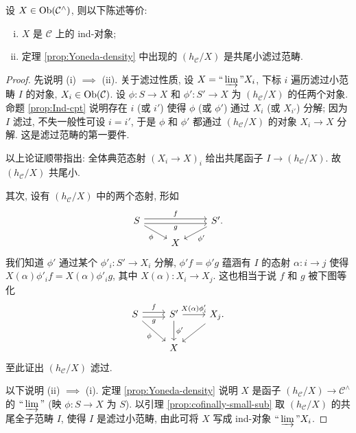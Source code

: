 \begin{proposition}[辨认 ind-对象]\label{prop:recognize-ind}
	设 $X \in \operatorname{Ob}(\mathcal{C}^\wedge)$, 则以下陈述等价:
	\begin{enumerate}[(i)]
		\item $X$ 是 $\mathcal{C}$ 上的 ind-对象;
		\item 定理 \ref{prop:Yoneda-density} 中出现的 $(h_{\mathcal{C}}/X)$ 是共尾小滤过范畴.
	\end{enumerate}
\end{proposition}
\begin{proof}
	先说明 (i) $\implies$ (ii). 关于滤过性质, 设 $X = \Yinjlim X_i$, 下标 $i$ 遍历滤过小范畴 $I$ 的对象, $X_i \in \operatorname{Ob}(\mathcal{C})$. 设 $\phi: S \to X$ 和 $\phi': S' \to X$ 为 $(h_{\mathcal{C}}/X)$ 的任两个对象. 命题 \ref{prop:Ind-cpt} 说明存在 $i$ (或 $i'$) 使得 $\phi$ (或 $\phi'$) 通过 $X_i$ (或 $X_{i'}$) 分解; 因为 $I$ 滤过, 不失一般性可设 $i = i'$, 于是 $\phi$ 和 $\phi'$ 都通过 $(h_{\mathcal{C}}/X)$ 的对象 $X_i \to X$ 分解. 这是滤过范畴的第一要件.
	
	以上论证顺带指出: 全体典范态射 $(X_i \to X)_i$ 给出共尾函子 $I \to (h_{\mathcal{C}}/X)$. 故 $(h_{\mathcal{C}}/X)$ 共尾小.
	
	其次, 设有 $(h_{\mathcal{C}}/X)$ 中的两个态射, 形如
	\[\begin{tikzcd}[row sep=small]
		S \arrow[rr, shift left, "f"] \arrow[rr, shift right, "g"'] \arrow[rd, "\phi"'] & & S' . \arrow[ld, "{\phi'}"] \\
		& X &
	\end{tikzcd}\]
	我们知道 $\phi'$ 通过某个 $\phi'_i: S' \to X_i$ 分解, $\phi' f = \phi' g$ 蕴涵有 $I$ 的态射 $\alpha: i \to j$ 使得 $X(\alpha) \phi'_i f = X(\alpha) \phi'_i g$, 其中 $X(\alpha): X_i \to X_j$. 这也相当于说 $f$ 和 $g$ 被下图等化
	\[\begin{tikzcd}
		S \arrow[r, shift left, "f"] \arrow[r, shift right, "g"'] \arrow[rd, "\phi"'] & S' \arrow[d, "{\phi'}"] \arrow[r, "{X(\alpha) \phi'_i}"] & X_j . \arrow[ld] \\
		& X &
	\end{tikzcd}\]
	至此证出 $(h_{\mathcal{C}}/X)$ 滤过.
	
	以下说明 (ii) $\implies$ (i). 定理 \ref{prop:Yoneda-density} 说明 $X$ 是函子 $(h_{\mathcal{C}}/X) \to \mathcal{C}^\wedge$ 的 $\Yinjlim$ (映 $\phi: S \to X$ 为 $S$). 以引理 \ref{prop:cofinally-small-sub} 取 $(h_{\mathcal{C}}/X)$ 的共尾全子范畴 $I$, 使得 $I$ 是滤过小范畴, 由此可将 $X$ 写成 ind-对象 $\Yinjlim X_i$.
\end{proof}

